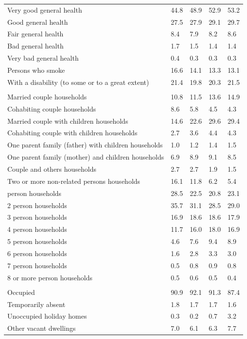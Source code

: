\documentclass{article}
\begin{document}
\begin{table}[h]
\begin{tabular}{KTTTT}
    \hline
Very good general health & 44.8& 48.9&52.9& 53.2\\
Good general health & 27.5& 27.9& 29.1& 29.7\\
Fair general health & 8.4& 7.9&8.2& 8.6\\
Bad general health & 1.7& 1.5&1.4& 1.4\\
Very bad general health & 0.4& 0.3&0.3& 0.3\\
    \hline
Persons who smoke & 16.6& 14.1&13.3& 13.1\\
    \hline
With a disability (to some or to a great extent) & 21.4& 19.8&20.3& 21.5\\
\hline
    \\ 
    \hline
Married couple households & 10.8& 11.5& 13.6& 14.9\\
Cohabiting couple households & 8.6& 5.8& 4.5& 4.3\\
Married couple with children households & 14.6& 22.6& 29.6& 29.4\\
Cohabiting couple with children households & 2.7& 3.6& 4.4& 4.3\\
One parent family (father) with  children households & 1.0& 1.2& 1.4& 1.5\\
One parent family (mother) and children households & 6.9& 8.9& 9.1& 8.5\\
Couple and others households  & 2.7& 2.7& 1.9& 1.5\\
Two or more non-related persons households & 16.1& 11.8&  6.2&  5.4\\
     person households & 28.5& 22.5& 20.8& 23.1\\
2 person households & 35.7& 31.1& 28.5& 29.0\\
3 person households & 16.9& 18.6& 18.6& 17.9\\
4 person households & 11.7& 16.0& 18.0& 16.9\\
5 person households & 4.6& 7.6& 9.4& 8.9\\
6 person households & 1.6& 2.8& 3.3& 3.0\\
7 person households & 0.5& 0.8& 0.9& 0.8\\
8 or more person households & 0.5& 0.6& 0.5& 0.4\\
\hline
    \\ 
    \hline
Occupied & 90.9& 92.1& 91.3& 87.4\\
Temporarily absent & 1.8& 1.7& 1.7& 1.6\\
Unoccupied holiday homes & 0.3& 0.2& 0.7& 3.2\\
Other vacant dwellings & 7.0& 6.1& 6.3& 7.7\\
\hline
\end{tabular}
\end{table}
\end{document}
